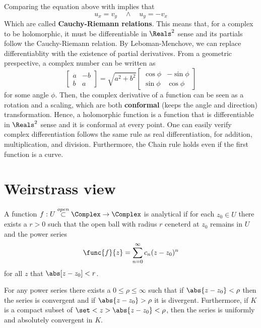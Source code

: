 Comparing the equation above with  implies that 
\begin{equation*}
    u_x =v_y \quad \land \quad u_y = - v_x
\end{equation*}
Which are called \textbf{Cauchy-Riemann relations}. This means that, for a complex to be holomorphic, it must be differentiable in \(\Reals^2\) sense and its partials follow the Cauchy-Riemann relation. By Leboman-Menchove, we can replace differentiablity with the existence of partial derivatives. From a geometric prespective, a complex number can be written as 
\begin{equation*}
    \begin{bmatrix*}
        a& -b\\
        b & a
    \end{bmatrix*} = \sqrt{a^2 + b^2} \begin{bmatrix*}
        \cos \phi& - \sin \phi\\
        \sin \phi &  \cos \phi
    \end{bmatrix*}
\end{equation*}
for some angle \(\phi\). Then, the complex derivative of a function can be seen as a rotation and a scaling, which are both \textbf{conformal} (keeps the angle and direction) transformation. Hence, a holomorphic function is a function that is differentiable in \(\Reals^2\) sense and it is conformal at every point.
One can easily verify complex differentiation follows the same rule as real differentiation, for addition, multiplication, and division. Furthermore, the Chain rule holds even if the first function is a curve.
\section{Weirstrass view}
\begin{definition}[Analytical]
    A function \(f: U \overset{open}{\subset} \Complex \to \Complex \) is analytical if for each \(z_0 \in U\) there exists a \(r > 0\) such that the open ball with radius \(r\) ceneterd at \(z_0\) remains in \(U\) and the power series 
    \begin{equation*}
        \func{f}{z} = \sum_{n = 0}^\infty c_n (z - z_0)^n
    \end{equation*}
    for all \(z\) that \(\abs[z - z_0] < r\).
\end{definition}

\begin{lemma}
    For any power series there exists a \(0 \leq \rho \leq \infty\) such that if \(\abs{z - z_0} < \rho\) then the series is convergent and if \(\abs{z- z_0} > \rho\) it is divergent. Furthermore, if \(K\) is a compact subset of \(\set<z>{\abs{z - z_0} < \rho}\), then the series is uniformly and absolutely convergent in \(K\).
\end{lemma}


